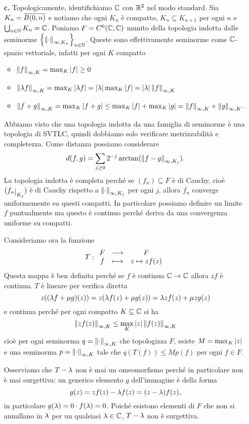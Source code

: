\documentclass[a4paper]{article}
\newcommand{\normd}{{\norm{\cdot}}}
\begin{document}
\begin{solution}
\begin{itemize}
\item[\textbf{c.}] Topologicamente, identifichiamo $\mathbb{C}$ con $\mathbb{R}^2$ nel modo standard. Sia $K_n=\overline{B(0,n)}$ e notiamo che ogni $K_n$ \`e compatto, $K_{n}\subseteq K_{n+1}$ per ogni $n$ e $\bigcup_{n\in\mathbb{N}} K_n=\mathbb{C}$. Poniamo $F=C^0(\mathbb{C},\mathbb{C})$ munito della topologia indotta dalle seminorme $\cpa{\normd_{\infty,K_n}}_{n\in \N}$. Queste sono effettivamente seminorme come $\mathbb{C}$-spazio vettoriale, infatti per ogni $K$ compatto
\begin{itemize}
\item $\left\Vert{f}\right\Vert_{\infty,K}=\max_K\left|{f}\right|\geq 0$
\item $\left\Vert{\lambda f}\right\Vert_{\infty,K}=\max_K\left|{\lambda f}\right|=\left|{\lambda}\right|\max_K\left|{f}\right|=\left|{\lambda}\right|\left\Vert{f}\right\Vert_{\infty,K}$
\item $\left\Vert{f+g}\right\Vert_{\infty,K}=\max_K\left|{f+g}\right|\leq \max_K\left|{f}\right|+\max_K\left|{g}\right|=\left\Vert{f}\right\Vert_{\infty,K}+\left\Vert{g}\right\Vert_{\infty,K}$.
\end{itemize}
Abbiamo visto che una topologia indotta da una famiglia di seminorme \`e una topologia di SVTLC, quindi dobbiamo solo verificare metrizzabilit\`a e completezza. Come distanza possiamo considerare
\[d(f,g)=\sum_{j\geq 0}2^{-j}\arctan(\left\Vert{f-g}\right\Vert_{\infty,K_j}).\]
La topologia indotta \`e completa perch\'e se $(f_n)\subseteq F$ \`e di Cauchy, cio\`e $(f_n\res{K_j})$ \`e di Cauchy rispetto a $\normd_{\infty,K_j}$ per ogni $j$, allora $f_n$ converge uniformemente su questi compatti. In particolare possiamo definire un limite $f$ puntualmente ma questo \`e continuo perch\'e deriva da una convergenza uniforme su compatti.\medskip


Consideriamo ora la funzione
\[T:\begin{array}{ccc} {F} & \longrightarrow & {F}\\ {f} & \longmapsto & {z\mapsto zf(z)} \end{array}\]
Questa mappa \`e ben definita perch\'e se $f$ \`e continua $\mathbb{C}\to \mathbb{C}$ allora $zf$ \`e continua. $T$ \`e lineare per verifica diretta
\[z((\lambda f+\mu g)(z))=z(\lambda f(z)+\mu g(z))=\lambda zf(z)+\mu zg(z)\]
e continua perch\'e per ogni compatto $K\subseteq \mathbb{C}$ si ha
\[\left\Vert{zf(z)}\right\Vert_{\infty,K}\leq \max_K\left|{z}\right|\left\Vert{f(z)}\right\Vert_{\infty,K}\]
cio\`e per ogni seminorma $q=\normd_{\infty,K}$ che topologizza $F$, esiste $M=\max_K\left|{z}\right|$ e una seminorma $p=\normd_{\infty,K}$ tale che $q(T(f))\leq M p(f)$ per ogni $f\in F$.

Osserviamo che $T-\lambda$ non \`e mai un omeomorfismo perch\'e in particolare non \`e mai surgettiva: un generico elemento $g$ dell'immagine \`e della forma 
\[g(z)=zf(z)-\lambda f(z)=(z-\lambda)f(z),\]
in particolare $g(\lambda)=0\cdot f(\lambda)=0$. Poich\'e esistono elementi di $F$ che non si annullano in $\lambda$ per un qualsiasi $\lambda\in \mathbb{C}$, $T-\lambda$ non \`e surgettiva. 
\end{itemize}
\setlength{\leftmargini}{0.5cm}
\end{solution}
\end{document}
